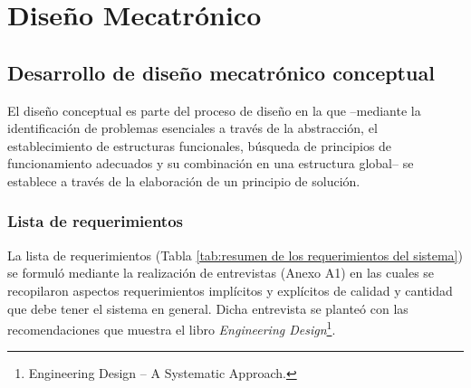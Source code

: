 
\pagestyle{myportland}
\doublespacing
\chapter[----- Diseño Mecatrónico]{Diseño Mecatrónico}
\thispagestyle{myportland}

\section{Desarrollo de diseño mecatrónico conceptual}
\label{sec:desarrollo del diseno mecatronico conceptual}

El diseño conceptual es parte del proceso de diseño en la que --mediante la identificación de problemas esenciales a través de la abstracción, el establecimiento de estructuras funcionales, búsqueda de principios de funcionamiento adecuados y su combinación en una estructura global-- se establece a través de la elaboración de un principio de solución.\cite[p.~159]{Pahl2007}

\subsection{Lista de requerimientos}

La lista de requerimientos (Tabla \ref{tab:resumen de los requerimientos del sistema}) se formuló mediante la realización de entrevistas (Anexo  A1) en las cuales se recopilaron aspectos requerimientos implícitos y explícitos de calidad y cantidad que debe tener el sistema en general. Dicha entrevista se planteó con las recomendaciones que muestra el libro \textit{Engineering Design}\footnote{Engineering Design – A Systematic Approach.\cite[p.~144-158]{Pahl2007}}.

